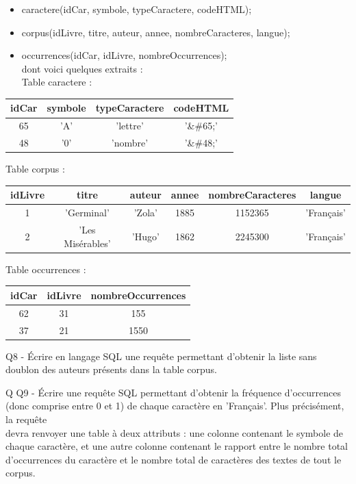 \documentclass[10pt]{article}
\begin{document}
\begin{itemize}
  \item caractere(idCar, symbole, typeCaractere, codeHTML);
  \item corpus(idLivre, titre, auteur, annee, nombreCaracteres, langue);
  \item occurrences(idCar, idLivre, nombreOccurrences);\\
dont voici quelques extraits :\\
Table caractere :
\end{itemize}

\begin{center}
\begin{tabular}{|c|c|c|c|}
\hline
idCar & symbole & typeCaractere & codeHTML \\
\hline\hline
65 & 'A' & 'lettre' & '\&\#65;' \\
48 & '0' & 'nombre' & '\&\#48;' \\
\end{tabular}
\end{center}

Table corpus :

\begin{center}
\begin{tabular}{|c|c|c|c|c|c|}
\hline
idLivre & titre & auteur & annee & nombreCaracteres & langue \\
\hline\hline
1 & 'Germinal' & 'Zola' & 1885 & 1152365 & 'Français' \\
2 & 'Les Misérables' & 'Hugo' & 1862 & 2245300 & 'Français' \\
\end{tabular}
\end{center}

Table occurrences :

\begin{center}
\begin{tabular}{|c|c|c|}
\hline
idCar & idLivre & nombreOccurrences \\
\hline\hline
62 & 31 & 155 \\
37 & 21 & 1550 \\
\end{tabular}
\end{center}

Q8 - Écrire en langage SQL une requête permettant d'obtenir la liste sans doublon des auteurs présents dans la table corpus.

Q Q9 - Écrire une requête SQL permettant d'obtenir la fréquence d'occurrences (donc comprise entre 0 et 1) de chaque caractère en 'Français'. Plus précisément, la requête\\
devra renvoyer une table à deux attributs : une colonne contenant le symbole de chaque caractère, et une autre colonne contenant le rapport entre le nombre total d'occurrences du caractère et le nombre total de caractères des textes de tout le corpus.
\end{document}
